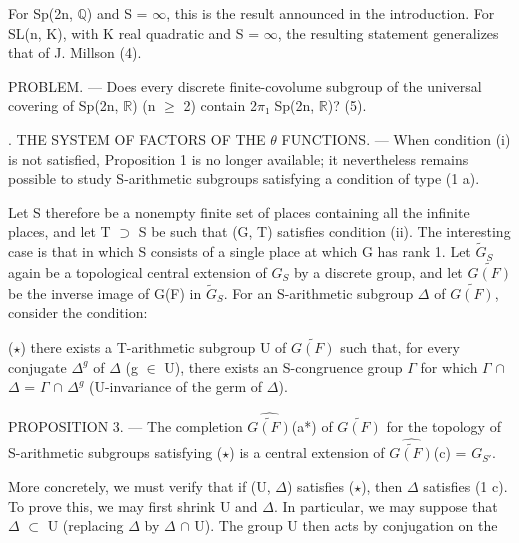 \documentclass[10pt,a4paper]{article}
\begin{document}
\smallskip
\noindent For Sp(2n, \ensuremath{ℚ}) and S = \ensuremath{∞}, this is the result announced in the introduction. For SL(n, K), with K real quadratic and S = \ensuremath{∞}, the resulting statement generalizes that of J. Millson (4).\par
\smallskip
\noindent PROBLEM. — Does every discrete finite-covolume subgroup of the universal covering of Sp(2n, \ensuremath{ℝ}) (n \ensuremath{≥} 2) contain 2\ensuremath{π₁} Sp(2n, \ensuremath{ℝ})? (5).\par
\smallskip
{}. THE SYSTEM OF FACTORS OF THE \ensuremath{θ} FUNCTIONS. — When condition (i) is not satisfied, Proposition 1 is no longer available; it nevertheless remains possible to study S-arithmetic subgroups satisfying a condition of type (1 a).\par
\smallskip
\noindent Let S therefore be a nonempty finite set of places containing all the infinite places, and let T \ensuremath{⊃} S be such that (G, T) satisfies condition (ii). The interesting case is that in which S consists of a single place at which G has rank 1. Let \ensuremath{\widetilde{G}_S} again be a topological central extension of \ensuremath{G_S} by a discrete group, and let \ensuremath{\widetilde{G(F)}} be the inverse image of G(F) in \ensuremath{\widetilde{G}_S}. For an S-arithmetic subgroup \ensuremath{Δ} of \ensuremath{\widetilde{G(F)}}, consider the condition:\par
\smallskip
\noindent (\ensuremath{\star}) there exists a T-arithmetic subgroup U of \ensuremath{\widetilde{G(F)}} such that, for every conjugate \ensuremath{Δ^g} of \ensuremath{Δ} (g \ensuremath{∈} U), there exists an S-congruence group \ensuremath{Γ} for which \ensuremath{Γ} \ensuremath{∩} \ensuremath{Δ} = \ensuremath{Γ} \ensuremath{∩} \ensuremath{Δ^g} (U-invariance of the germ of \ensuremath{Δ}).\par
\smallskip
\noindent PROPOSITION 3. — The completion \ensuremath{\widehat{\widetilde{G(F)}}}(a*) of \ensuremath{\widetilde{G(F)}} for the topology of S-arithmetic subgroups satisfying (\ensuremath{\star}) is a central extension of \ensuremath{\widehat{\widetilde{G(F)}}}(c) = \ensuremath{G_{S′}}.\par
\smallskip
\noindent More concretely, we must verify that if (U, \ensuremath{Δ}) satisfies (\ensuremath{\star}), then \ensuremath{Δ} satisfies (1 c). To prove this, we may first shrink U and \ensuremath{Δ}. In particular, we may suppose that \ensuremath{Δ} \ensuremath{⊂} U (replacing \ensuremath{Δ} by \ensuremath{Δ} \ensuremath{∩} U). The group U then acts by conjugation on the\par
\clearpage
{}\hypertarget{authority-page-0005}{}
\end{document}
